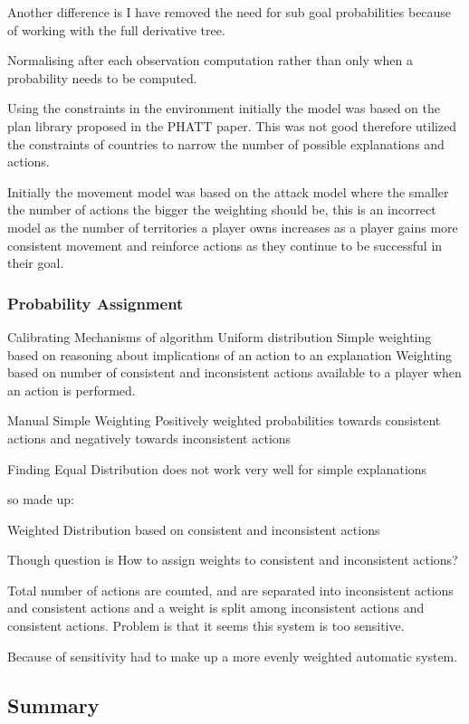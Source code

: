 \documentclass[parskip]{cs4rep}
\begin{document}
Another difference is I have removed the need for sub goal probabilities because of working with the full derivative tree.

Normalising after each observation computation rather than only when a probability needs to be computed.

Using the constraints in the environment initially the model was based on the plan library proposed in the PHATT paper. This was not good therefore utilized the constraints of countries to narrow the number of possible explanations and actions.

Initially the movement model was based on the attack model where the smaller the number of actions the bigger the weighting should be, this is an incorrect model as the number of territories a player owns increases as a player gains more consistent movement and reinforce actions as they continue to be successful in their goal.

\subsubsection{Probability Assignment}

Calibrating Mechanisms of algorithm
Uniform distribution
Simple weighting based on reasoning about implications of an action to an explanation
Weighting based on number of consistent and inconsistent actions available to a player when an action is performed.

Manual Simple Weighting
Positively weighted probabilities towards consistent actions and negatively towards inconsistent actions

Finding
Equal Distribution does not work very well for simple explanations

so made up:

Weighted Distribution based on consistent and inconsistent actions

Though question is How to assign weights to consistent and inconsistent actions?

Total number of actions are counted, and are separated into inconsistent actions and consistent actions and a weight is split among inconsistent actions and consistent actions. Problem is that it seems this system is too sensitive.

Because of sensitivity had to make up a more evenly weighted automatic system.

\subsection{Summary}
\end{document}
